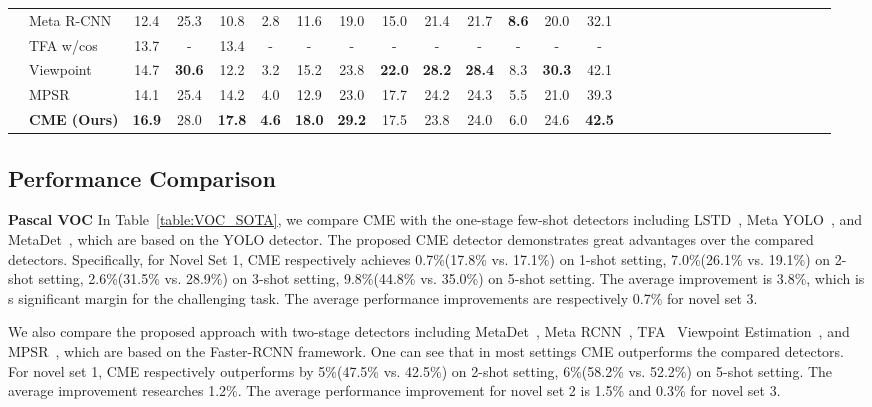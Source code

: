 \documentclass[final]{cvpr}
\begin{document}
\begin{table*}[t]
\begin{center}
\begin{tabular}{l|l|ccccccccccccccccccccccccccc}
    & {Meta R-CNN~\cite{MetaRCNN}} & 12.4 & 25.3 & 10.8 & 2.8 & 11.6 & 19.0 & 15.0 & 21.4 & 21.7 & \bf8.6 & 20.0 & 32.1 \\
    & {TFA w/cos~\cite{Frustratingly}} & 13.7 & - & 13.4 & - & - & - & - & - & - & - & - & - \\
    & {Viewpoint~\cite{viewpoint}} & 14.7 & \bf30.6 & 12.2 & 3.2 & 15.2 & 23.8 & \bf22.0 & \bf28.2 & \bf28.4 & 8.3 & \bf30.3 & 42.1\\
    & {MPSR~\cite{MPSR}} & 14.1 & 25.4 & 14.2 & 4.0 & 12.9 & 23.0 & 17.7 & 24.2 & 24.3 & 5.5 & 21.0 & 39.3\\
    & {\textbf{CME (Ours)}} & \bf16.9 & 28.0 & \bf17.8 & \bf4.6 & \bf18.0 & \bf29.2 & 17.5 &23.8 &24.0 &6.0 &24.6 & \bf42.5
 \\
    \hline
    \end{tabular}
\end{center}
    \end{table*}
    \setlength{\tabcolsep}{1.4pt}

\subsection{Performance Comparison}

\textbf{Pascal VOC}
In Table~\ref{table:VOC_SOTA}, we compare CME with the one-stage few-shot detectors including LSTD~\cite{LSTD}, Meta YOLO~\cite{FeatureReweighting}, and MetaDet~\cite{MetaDet}, which are based on the YOLO detector. 
The proposed CME detector demonstrates great advantages over the compared detectors.
Specifically, for Novel Set 1, CME respectively achieves 0.7\%(17.8\% vs. 17.1\%) on 1-shot setting, 7.0\%(26.1\% vs. 19.1\%) on 2-shot setting,  2.6\%(31.5\% vs. 28.9\%) on 3-shot setting, 9.8\%(44.8\% vs. 35.0\%) on 5-shot setting. The average improvement is 3.8\%, which is s significant margin for the challenging task. The average performance improvements are respectively {0.7\%} for novel set 3.

We also compare the proposed approach with two-stage detectors including  MetaDet~\cite{MetaDet}, Meta RCNN~\cite{MetaRCNN}, TFA~\cite{Frustratingly} Viewpoint Estimation~\cite{viewpoint}, and MPSR~\cite{MPSR}, which are based on the Faster-RCNN framework. One can see that in most settings CME outperforms the compared detectors. 
For novel set 1, CME respectively outperforms by 5\%(47.5\% vs. 42.5\%) on 2-shot setting,  6\%(58.2\% vs. 52.2\%) on 5-shot setting. The average improvement researches 1.2\%. The average performance improvement for novel set 2 is 1.5\% and 0.3\% for novel set 3.
\end{document}
